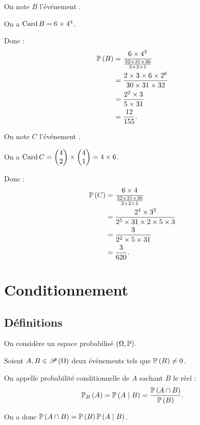 \begin{corr}[2]
On note \(B\) l'événement .

On a \(\Card B=6\times4^3\).

Donc : \[\begin{aligned}
\proba{B}&=\dfrac{6\times4^3}{\frac{32\times31\times30}{3\times2\times1}} \\
&=\dfrac{2\times3\times6\times2^6}{30\times31\times32} \\
&=\dfrac{2^2\times3}{5\times31} \\
&=\dfrac{12}{155}.
\end{aligned}\]
\end{corr}

\begin{corr}[3]
On note \(C\) l'événement .

On a \(\Card C=\binom{2}{4}\times\binom{1}{4}=4\times6\).

Donc : \[\begin{aligned}
\proba{C}&=\dfrac{6\times4}{\frac{32\times31\times30}{3\times2\times1}} \\
&=\dfrac{2^4\times3^2}{2^5\times31\times2\times5\times3} \\
&=\dfrac{3}{2^2\times5\times31} \\
&=\dfrac{3}{620}.
\end{aligned}\]
\end{corr}

\section{Conditionnement}

\subsection{Définitions}

On considère un espace probabilisé \(\groupe{\Omega}[\prem]\).

\begin{defi}
Soient \(A,B\in\P{\Omega}\) deux événements tels que \(\proba{B}\not=0\).

On appelle probabilité conditionnelle de \(A\) sachant \(B\) le réel : \[\probacond{A}{B}=\proba{A\mid B}=\dfrac{\proba{A\inter B}}{\proba{B}}.\]
\end{defi}

\begin{rem}
On a donc \(\proba{A\inter B}=\proba{B}\proba{A\mid B}\).
\end{rem}

